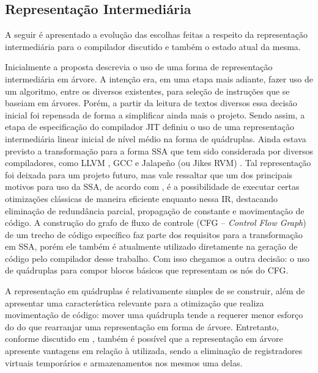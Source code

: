 \subsection{Representação Intermediária}
A seguir é apresentado a evolução das escolhas feitas a respeito da
representação intermediária para o compilador discutido e também o
estado atual da mesma.

Inicialmente a proposta descrevia o uso de uma forma de representação
intermediária em árvore. A intenção era, em uma etapa mais adiante,
fazer uso de um algoritmo, entre os diversos existentes, para seleção
de instruções que se baseiam em árvores. %
Porém, a partir da leitura de
textos diversos essa decisão inicial foi repensada de forma a
simplificar ainda mais o projeto.
Sendo assim, a etapa de especificação do compilador JIT
definiu o uso de uma representação intermediária linear inicial de nível
médio na forma de
quádruplas. Ainda estava previsto a transformação para a forma SSA que
tem sido considerada por diversos compiladores, como LLVM
\cite{llvm1}, GCC \cite{gcc-ssa} e Jalapeño (ou Jikes RVM)
\cite{jalapeno_1}. Tal representação foi deixada para um projeto futuro,
mas vale ressaltar que um dos principais motivos para uso da SSA, de
acordo com , é a possibilidade de executar certas
otimizações clássicas de maneira eficiente
enquanto nessa IR, destacando eliminação de redundância parcial,
propagação de constante e movimentação de código.
A construção do grafo de fluxo de controle (CFG
-- \textit{Control Flow Graph}) de um trecho de código específico faz
parte dos requisitos para a transformação em SSA, porém ele também é
atualmente utilizado diretamente na geração de código pelo compilador
desse trabalho. Com isso
chegamos a outra decisão: o uso de quádruplas para compor blocos
básicos que representam os nós do CFG.

A representação em quádruplas é relativamente simples de se construir,
além de apresentar uma característica relevante para a otimização que
realiza movimentação de código: mover uma quádrupla tende a requerer
menor esforço do do que rearranjar uma representação em forma de
árvore. Entretanto, conforme discutido em ,
também é possível que a representação em árvore apresente vantagens
em relação à utilizada, sendo a eliminação de registradores virtuais
temporários e armazenamentos nos mesmos uma delas.

